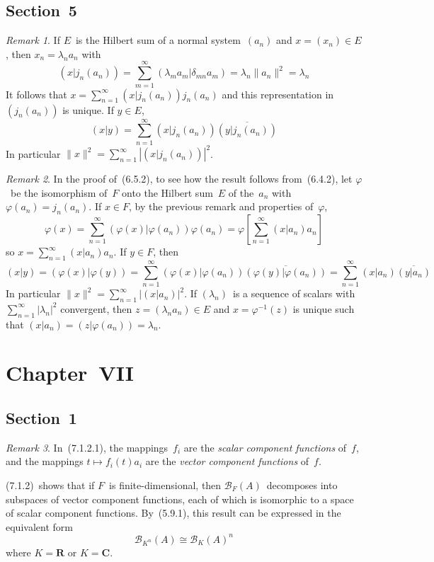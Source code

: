 \documentclass[letterpaper,12pt]{article}
\newcommand{\R}{\mathbf{R}}
\newcommand{\C}{\mathbf{C}}
\newcommand{\B}{\mathcal{B}}
\newcommand{\iso}{\cong}
\newcommand{\conj}[1]{\overline{#1}}
\newcommand{\inv}[1]{#1^{-1}}
\newcommand{\abs}[1]{|{#1}|}
\newcommand{\norm}[1]{\lVert{#1}\rVert}
\newcommand{\innerprod}[2]{({#1}|{#2})}
\theoremstyle{plain}
\theoremstyle{definition}
\theoremstyle{remark}
\newtheorem*{rmk}{Remark}
\begin{document}
\subsection*{Section~5}
\begin{rmk}
If \(E\)~is the Hilbert sum of a normal system~\((a_n)\) and \(x=(x_n)\in E\), then \(x_n=\lambda_n a_n\) with
\[\innerprod{x}{j_n(a_n)}=\sum_{m=1}^{\infty}\innerprod{\lambda_ma_m}{\delta_{mn}a_m}=\lambda_n\norm{a_n}^2=\lambda_n\]
It follows that \(x=\sum_{n=1}^{\infty}\innerprod{x}{j_n(a_n)}j_n(a_n)\) and this representation in~\((j_n(a_n))\) is unique. If \(y\in E\),
\[\innerprod{x}{y}=\sum_{n=1}^{\infty}\innerprod{x}{j_n(a_n)}\conj{\innerprod{y}{j_n(a_n)}}\]
In particular \(\norm{x}^2=\sum_{n=1}^{\infty}\abs{\innerprod{x}{j_n(a_n)}}^2\).
\end{rmk}

\begin{rmk}
In the proof of~(6.5.2), to see how the result follows from~(6.4.2), let \(\varphi\)~be the isomorphism of~\(F\) onto the Hilbert sum~\(E\) of the~\(a_n\) with \(\varphi(a_n)=j_n(a_n)\). If \(x\in F\), by the previous remark and properties of~\(\varphi\),
\[\varphi(x)=\sum_{n=1}^{\infty}\innerprod{\varphi(x)}{\varphi(a_n)}\varphi(a_n)=\varphi\left[\sum_{n=1}^{\infty}\innerprod{x}{a_n}a_n\right]\]
so \(x=\sum_{n=1}^{\infty}\innerprod{x}{a_n}a_n\). If \(y\in F\), then
\[\innerprod{x}{y}=\innerprod{\varphi(x)}{\varphi(y)}=\sum_{n=1}^{\infty}\innerprod{\varphi(x)}{\varphi(a_n)}\conj{\innerprod{\varphi(y)}{\varphi(a_n)}}=\sum_{n=1}^{\infty}\innerprod{x}{a_n}\conj{\innerprod{y}{a_n}}\]
In particular \(\norm{x}^2=\sum_{n=1}^{\infty}\abs{\innerprod{x}{a_n}}^2\). If \((\lambda_n)\)~is a sequence of scalars with \(\sum_{n=1}^{\infty}\abs{\lambda_n}^2\) convergent, then \(z=(\lambda_na_n)\in E\) and \(x=\inv{\varphi}(z)\) is unique such that \(\innerprod{x}{a_n}=\innerprod{z}{\varphi(a_n)}=\lambda_n\).
\end{rmk}

\section*{Chapter~VII}
\subsection*{Section~1}
\begin{rmk}
In~(7.1.2.1), the mappings~\(f_i\) are the \emph{scalar component functions} of~\(f\), and the mappings \(t\mapsto f_i(t)a_i\) are the \emph{vector component functions} of~\(f\).

(7.1.2)~shows that if \(F\)~is finite-dimensional, then \(\B_F(A)\)~decomposes into subspaces of vector component functions, each of which is isomorphic to a space of scalar component functions. By~(5.9.1), this result can be expressed in the equivalent form
\[\B_{K^n}(A)\iso\B_K(A)^n\]
where \(K=\R\) or \(K=\C\).
\end{rmk}
\end{document}
